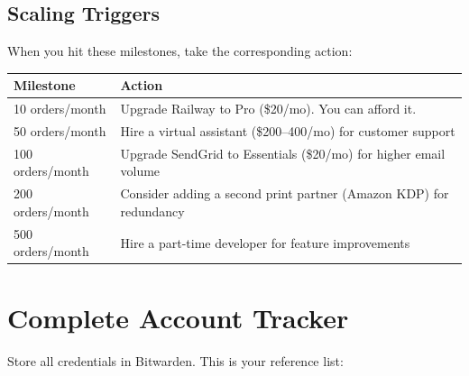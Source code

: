 \documentclass[12pt, letterpaper, oneside]{book}
\begin{document}
\section{Scaling Triggers}

When you hit these milestones, take the corresponding action:

\begin{table}[H]
\centering
\begin{tabularx}{\textwidth}{lX}
\toprule
\textbf{Milestone} & \textbf{Action} \\
\midrule
10 orders/month & Upgrade Railway to Pro (\$20/mo). You can afford it. \\
50 orders/month & Hire a virtual assistant (\$200--400/mo) for customer support \\
100 orders/month & Upgrade SendGrid to Essentials (\$20/mo) for higher email volume \\
200 orders/month & Consider adding a second print partner (Amazon KDP) for redundancy \\
500 orders/month & Hire a part-time developer for feature improvements \\
\bottomrule
\end{tabularx}
\end{table}


\appendix
\chapter{Complete Account Tracker}

Store all credentials in Bitwarden. This is your reference list:
\end{document}
